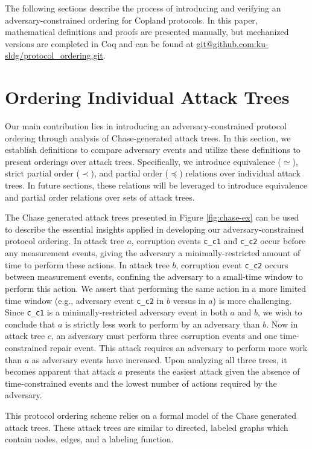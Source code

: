\documentclass[runningheads]{llncs}
\theoremstyle{definition}
\begin{document}
The following sections describe the process of introducing and verifying an adversary-constrained ordering for Copland protocols. In this paper, mathematical definitions and proofs are presented manually, but mechanized versions are completed in Coq and can be found at \url{git@github.com:ku-sldg/protocol_ordering.git}.


\section{Ordering Individual Attack Trees}

Our main contribution lies in introducing an adversary-constrained protocol ordering through analysis of Chase-generated attack trees. In this section, we establish definitions to compare adversary events and utilize these definitions to present orderings over attack trees. Specifically, we introduce equivalence ($\simeq$), strict partial order ($\prec$), and partial order ($\preceq$) relations over individual attack trees. In future sections, these relations will be leveraged to introduce equivalence and partial order relations over sets of attack trees.

The Chase generated attack trees presented in Figure \ref{fig:chase-ex} can be used to describe the essential insights applied in developing our adversary-constrained protocol ordering. In attack tree $a$, corruption events \texttt{c\_c1} and \texttt{c\_c2} occur before any measurement events, giving the adversary a minimally-restricted amount of time to perform these actions. In attack tree $b$, corruption event \texttt{c\_c2} occurs between measurement events, confining the adversary to a small-time window to perform this action. We assert that performing the same action in a more limited time window (e.g., adversary event \texttt{c\_c2} in $b$ versus in $a$) is more challenging. Since \texttt{c\_c1} is a minimally-restricted adversary event in both $a$ and $b$, we wish to conclude that $a$ is strictly less work to perform by an adversary than $b$. Now in attack tree $c$, an adversary must perform three corruption events and one time-constrained repair event. This attack requires an adversary to perform more work than $a$ as adversary events have increased. Upon analyzing all three trees, it becomes apparent that attack $a$ presents the easiest attack given the absence of time-constrained events and the lowest number of actions required by the adversary. 



This protocol ordering scheme relies on a formal model of the Chase generated attack trees. These attack trees are similar to directed, labeled graphs which contain nodes, edges, and a labeling function. 
\end{document}
